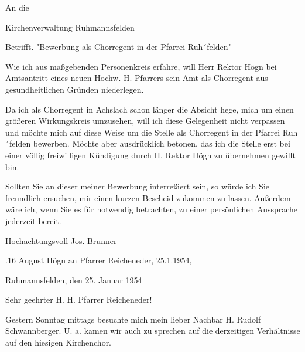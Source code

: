 \documentclass[12pt,a4paper]{book}
\begin{document}
An die

Kirchenverwaltung Ruhmannsfelden



Betrifft. "Bewerbung als Chorregent in der Pfarrei Ruh´felden"



Wie ich aus maßgebenden Personenkreis erfahre, will Herr Rektor Högn bei
Amtsantritt eines neuen Hochw. H. Pfarrers sein Amt als Chorregent aus
gesundheitlichen Gründen niederlegen.

Da ich als Chorregent in Achslach schon länger die Absicht hege, mich um einen
größeren Wirkungskreis umzusehen, will ich diese Gelegenheit nicht verpassen und
möchte mich auf diese Weise um die Stelle als Chorregent in der Pfarrei
Ruh´felden bewerben. Möchte aber ausdrücklich betonen, das ich die Stelle erst
bei einer völlig freiwilligen Kündigung durch H. Rektor Högn zu übernehmen
gewillt bin.

Sollten Sie an dieser meiner Bewerbung interreßiert sein, so würde ich Sie
freundlich ersuchen, mir einen kurzen Bescheid zukommen zu lassen. Außerdem wäre
ich, wenn Sie es für notwendig betrachten, zu einer persönlichen Aussprache
jederzeit bereit.



Hochachtungsvoll Jos. Brunner

.16 August Högn an Pfarrer Reicheneder, 25.1.1954,

Ruhmannsfelden, den 25. Januar 1954



Sehr geehrter H. H. Pfarrer Reicheneder!



Gestern Sonntag mittags besuchte mich mein lieber Nachbar H. Rudolf
Schwannberger. U. a. kamen wir auch zu sprechen auf die derzeitigen Verhältnisse
auf den hiesigen Kirchenchor.
\end{document}
